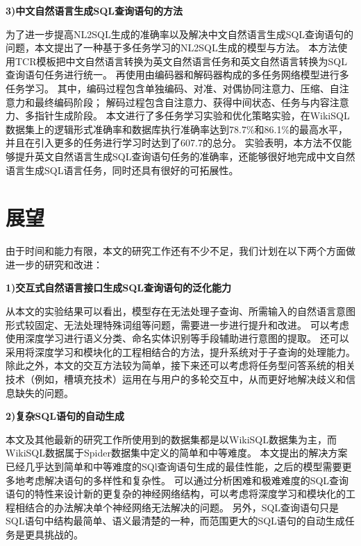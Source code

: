 \textbf{3)中文自然语言生成SQL查询语句的方法}

为了进一步提高NL2SQL生成的准确率以及解决中文自然语言生成SQL查询语句的问题，本文提出了一种基于多任务学习的NL2SQL生成的模型与方法。
本方法使用TCR模板把中文自然语言转换为英文自然语言任务和英文自然语言转换为SQL查询语句任务进行统一。
再使用由编码器和解码器构成的多任务网络模型进行多任务学习。
其中，编码过程包含单独编码、对准、对偶协同注意力、压缩、自注意力和最终编码阶段；
解码过程包含自注意力、获得中间状态、任务与内容注意力、多指针生成阶段。
本文进行了多任务学习实验和优化策略实验，在WikiSQL数据集上的逻辑形式准确率和数据库执行准确率达到78.7\%和86.1\%的最高水平，并且在引入更多的任务进行学习时达到了607.7的总分。
实验表明，本方法不仅能够提升英文自然语言生成SQL查询语句任务的准确率，还能够很好地完成中文自然语言生成SQL语言任务，同时还具有很好的可拓展性。


\section{展望}

由于时间和能力有限，本文的研究工作还有不少不足，我们计划在以下两个方面做进一步的研究和改进：

\textbf{1)交互式自然语言接口生成SQL查询语句的泛化能力}

从本文的实验结果可以看出，模型存在无法处理子查询、所需输入的自然语言意图形式较固定、无法处理特殊词组等问题，需要进一步进行提升和改进。
可以考虑使用深度学习进行语义分类、命名实体识别等手段辅助进行意图的提取。
还可以采用将深度学习和模块化的工程相结合的方法，提升系统对于子查询的处理能力。
除此之外，本文的交互方法较为简单，接下来还可以考虑将任务型问答系统的相关技术（例如，槽填充技术）运用在与用户的多轮交互中，从而更好地解决歧义和信息缺失的问题。


\textbf{2)复杂SQL语句的自动生成}

本文及其他最新的研究工作所使用到的数据集都是以WikiSQL数据集为主，而WikiSQL数据属于Spider数据集中定义的简单和中等难度。
本文提出的解决方案已经几乎达到简单和中等难度的SQl查询语句生成的最佳性能，之后的模型需要更多地考虑解决语句的多样性和复杂性。
可以通过分析困难和极难难度的SQL查询语句的特性来设计新的更复杂的神经网络结构，可以考虑将深度学习和模块化的工程相结合的办法解决单个神经网络无法解决的问题。
另外，SQL查询语句只是SQL语句中结构最简单、语义最清楚的一种，而范围更大的SQL语句的自动生成任务是更具挑战的。

